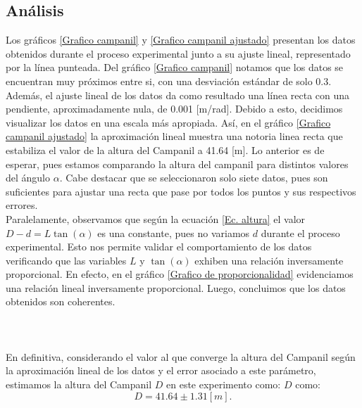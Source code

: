 \documentclass[10pt,a4paper]{article}
\begin{document}
\begin{multicols}{2}
	\section{Análisis}
Los gráficos \ref{Grafico campanil} y \ref{Grafico campanil ajustado}  presentan los datos obtenidos durante el proceso experimental junto a su ajuste lineal, 		representado por la línea punteada. Del gráfico \ref{Grafico campanil} notamos que los datos se encuentran muy próximos entre si, 	con una desviación estándar de solo 0.3. Además, el ajuste lineal de los datos da como resultado una línea recta con una pendiente, aproximadamente nula, de 0.001 [m/rad]. Debido a esto, decidimos visualizar los datos en una escala más apropiada. Así, en el gráfico \ref{Grafico campanil ajustado} la aproximación lineal muestra una notoria linea recta que estabiliza el valor de la altura del Campanil a 41.64 [m]. Lo anterior es de esperar, pues estamos comparando la altura del campanil para distintos valores del ángulo $\alpha$. Cabe destacar que se seleccionaron solo siete datos, pues son suficientes para ajustar una recta que pase por todos los puntos y sus respectivos errores.\\

Paralelamente, observamos que según la ecuación \ref{Ec. altura} el valor $D - d = L \tan(\alpha)$ es una constante, pues no variamos  $d$ durante el proceso experimental. Esto nos permite validar el comportamiento de los datos verificando que las variables $L$ y $\tan(\alpha)$ exhiben una relación inversamente proporcional. En efecto, en el gráfico \ref{Grafico de proporcionalidad} evidenciamos una relación lineal inversamente proporcional. Luego, concluimos que los datos obtenidos son coherentes.\\
\\
\\
\\
En definitiva, considerando el valor al que converge la altura del Campanil según la aproximación lineal de los datos y el error asociado a este parámetro, estimamos la altura del Campanil $D$ en este experimento como: $D$ como: $$D = 41.64 \pm 1.31 [m].$$
	

\end{multicols}
\end{document}
